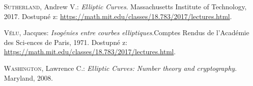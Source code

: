 \documentclass [12pt]{report}
\begin{document}
\begin{thebibliography}{97}
\textsc{Sutherland}, Andrew V.: \textit{Elliptic Curves}. Massachusetts Institute of Technology, 2017. Dostupné z: \url{https://math.mit.edu/classes/18.783/2017/lectures.html}. 

\textsc{Vélu}, Jacques: \textit{Isogénies entre courbes elliptiques}.Comptes Rendus de l’Académie des Sci-ences de Paris, 1971. Dostupné z: \url{https://math.mit.edu/classes/18.783/2017/lectures.html}. 


\textsc{Washington}, Lawrence C.: \textit{Elliptic Curves: Number theory and cryptography}. Maryland, 2008. 

\end{thebibliography}
\end{document}
